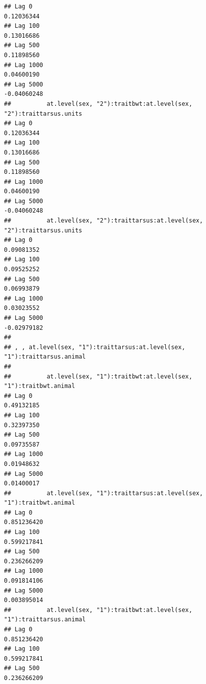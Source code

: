 \documentclass[
  12pt,
]{book}
\begin{document}
\begin{verbatim}
## Lag 0                                                          0.12036344
## Lag 100                                                        0.13016686
## Lag 500                                                        0.11898560
## Lag 1000                                                       0.04600190
## Lag 5000                                                      -0.04060248
##          at.level(sex, "2"):traitbwt:at.level(sex, "2"):traittarsus.units
## Lag 0                                                          0.12036344
## Lag 100                                                        0.13016686
## Lag 500                                                        0.11898560
## Lag 1000                                                       0.04600190
## Lag 5000                                                      -0.04060248
##          at.level(sex, "2"):traittarsus:at.level(sex, "2"):traittarsus.units
## Lag 0                                                             0.09081352
## Lag 100                                                           0.09525252
## Lag 500                                                           0.06993879
## Lag 1000                                                          0.03023552
## Lag 5000                                                         -0.02979182
## 
## , , at.level(sex, "1"):traittarsus:at.level(sex, "1"):traittarsus.animal
## 
##          at.level(sex, "1"):traitbwt:at.level(sex, "1"):traitbwt.animal
## Lag 0                                                        0.49132185
## Lag 100                                                      0.32397350
## Lag 500                                                      0.09735587
## Lag 1000                                                     0.01948632
## Lag 5000                                                     0.01400017
##          at.level(sex, "1"):traittarsus:at.level(sex, "1"):traitbwt.animal
## Lag 0                                                          0.851236420
## Lag 100                                                        0.599217841
## Lag 500                                                        0.236266209
## Lag 1000                                                       0.091814106
## Lag 5000                                                       0.003895014
##          at.level(sex, "1"):traitbwt:at.level(sex, "1"):traittarsus.animal
## Lag 0                                                          0.851236420
## Lag 100                                                        0.599217841
## Lag 500                                                        0.236266209

\end{verbatim}
\end{document}

